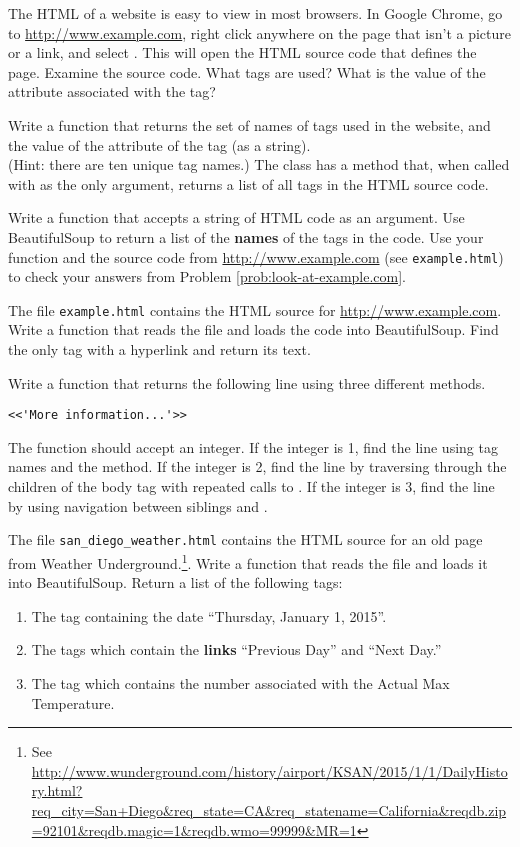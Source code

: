 The HTML of a website is easy to view in most browsers.
In Google Chrome, go to \url{http://www.example.com}, right click anywhere on the page that isn't a picture or a link, and select .
This will open the HTML source code that defines the page.
Examine the source code.
What tags are used?
What is the value of the  attribute associated with the  tag?

Write a function that returns the set of names of tags used in the website, and the value of the  attribute of the  tag (as a string).
\\(Hint: there are ten unique tag names.)
\label{prob:look-at-example.com}
The  class has a  method that, when called with  as the only argument, returns a list of all tags in the HTML source code.

Write a function that accepts a string of HTML code as an argument.
Use BeautifulSoup to return a list of the \textbf{names} of the tags in the code.
Use your function and the source code from \url{http://www.example.com} (see \texttt{example.html}) to check your answers from Problem \ref{prob:look-at-example.com}.

The file \texttt{example.html} contains the HTML source for \url{http://www.example.com}.
Write a function that reads the file and loads the code into BeautifulSoup.
Find the only  tag with a hyperlink and return its text.

Write a function that returns the following line using three different methods.
\begin{lstlisting}
<<'More information...'>>
\end{lstlisting}
The function should accept an integer.
If the integer is 1, find the line using tag names and the  method.
If the integer is 2, find the line by traversing through the children of the body tag with repeated calls to .
If the integer is 3, find the line by using navigation between siblings and .

The file \texttt{san\_diego\_weather.html} contains the HTML source for an old page from Weather Underground.\footnote{See \url{http://www.wunderground.com/history/airport/KSAN/2015/1/1/DailyHistory.html?req_city=San+Diego&req_state=CA&req_statename=California&reqdb.zip=92101&reqdb.magic=1&reqdb.wmo=99999&MR=1}}.
Write a function that reads the file and loads it into BeautifulSoup.
Return a list of the following tags:
\begin{enumerate}
\item The tag containing the date ``Thursday, January 1, 2015''.
\item The tags which contain the \textbf{links} ``Previous Day'' and ``Next Day.''
\item The tag which contains the number associated with the Actual Max Temperature.
\end{enumerate}

